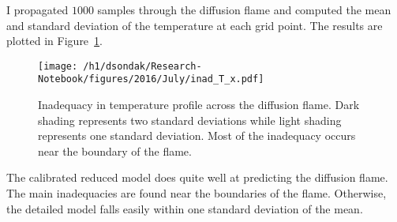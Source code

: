 I propagated $1000$ samples through the diffusion flame and computed the mean and standard deviation
of the temperature at each grid point.  The results are plotted in Figure~\ref{fig:inad_T_x}.
\begin{figure}[h!]
  \centering
  \texttt{[image: /h1/dsondak/Research-Notebook/figures/2016/July/inad\_T\_x.pdf]}
  \caption{Inadequacy in temperature profile across the diffusion flame.  Dark shading represents two
           standard deviations while light shading represents one standard deviation.  Most of the
           inadequacy occurs near the boundary of the flame.}
  \label{fig:inad_T_x}
\end{figure}
The calibrated reduced model does quite well at predicting the diffusion flame.  The main inadequacies 
are found near the boundaries of the flame.  Otherwise, the detailed model falls easily within one
standard deviation of the mean.




